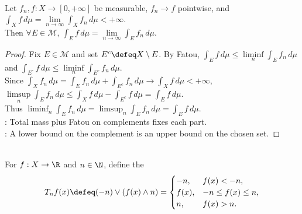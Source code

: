 \begin{proposition} \label{prop:setwise-convergence-from-total-mass-convergence} \\
Let $f_n,f:X\to[0,+\infty]$ be measurable, $f_n\to f$ pointwise, and $\int_X f\,d\mu=\lim\limits_{n\to\infty}\int_X f_n\,d\mu<+\infty$.\\
Then $\forall E\in\mathcal{M}$, $\int_E f\,d\mu=\lim\limits_{n\to\infty}\int_E f_n\,d\mu$.
\begin{proof}
Fix $E\in\mathcal{M}$ and set $E^c\defeq X\setminus E$. By Fatou, $\int_Ef\,d\mu\leq\liminf\limits_n\int_Ef_n\,d\mu$ and $\int_{E^c}f\,d\mu\leq\liminf\limits_n\int_{E^c}f_n\,d\mu$.\\
Since $\int_X f_n\,d\mu=\int_E f_n\,d\mu+\int_{E^c}f_n\,d\mu\to\int_Xf\,d\mu<+\infty$, $\limsup\limits_n\int_Ef_n\,d\mu\leq\int_Xf\,d\mu-\int_{E^c}f\,d\mu=\int_Ef\,d\mu$.\\
Thus $\liminf_n\int_Ef_n\,d\mu=\limsup_n\int_Ef_n\,d\mu=\int_Ef\,d\mu$.\\
: Total mass plus Fatou on complements fixes each part.\\
: A lower bound on the complement is an upper bound on the chosen set.
\end{proof}
\end{proposition}

\begin{definition} \label{def:function-truncates} \\
For $f:X\to\R$ and $n\in\N$, define the 
\begin{align}
T_nf(x)\defeq (-n)\vee(f(x)\wedge n)=
\begin{cases}
-n,&f(x)<-n,\\
f(x),&-n\leq f(x)\leq n,\\
n,&f(x)>n.
\end{cases} \nonumber
\end{align}
\end{definition}

